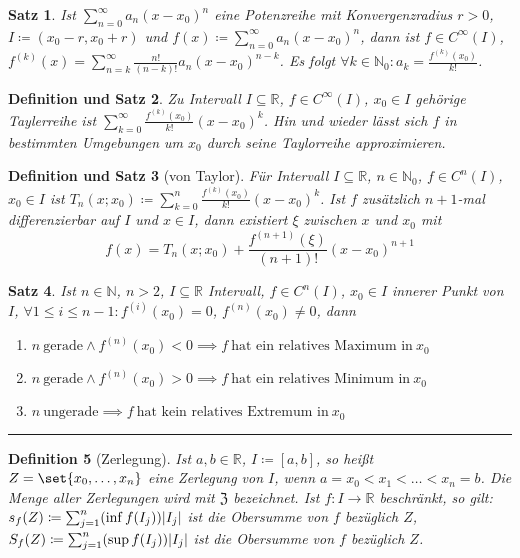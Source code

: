 \documentclass[a4paper]{article}
\newcounter{Sec}
\theoremstyle{marginbreak}
\newtheorem{definition}{Definition}[Sec]
\newtheorem{satz}[definition]{Satz}
\newtheorem{defsatz}[definition]{Definition und Satz}
\newcommand{\sep}{%
	\rule{\textwidth}{0.3pt}%
	\stepcounter{Sec}%
	}
\newcommand{\series}[1][1]{\sum_{n=#1}^\infty}
\newcommand{\ps}[1][a]{\series[0]#1_n(x-x_0)^n}
\begin{document}
	\begin{satz}
		Ist $\ps$ eine Potenzreihe mit Konvergenzradius $r>0$, $I\coloneqq(x_0-r,x_0+r)$ und
		$f(x)\coloneqq\ps$, dann ist $f\in C^\infty(I)$, $f^{(k)}(x)=\sum_{n=k}^{\infty}\frac{n!}{(n-k)!}a_n(x-x_0)^{n-k}$.
		Es folgt $\forall k\in\mathbb{N}_0:a_k=\frac{f^{(k)}(x_0)}{k!}$.
	\end{satz}
	\begin{defsatz}
		Zu Intervall $I\subseteq\mathbb{R}$, $f\in C^\infty(I)$, $x_0\in I$ gehörige
		Taylerreihe ist $\sum_{k=0}^\infty\frac{f^{(k)}(x_0)}{k!}(x - x_0)^k$.
		Hin und wieder lässt sich $f$ in bestimmten Umgebungen um $x_0$ durch seine
		Taylorreihe approximieren.
	\end{defsatz}
	\begin{defsatz}[von Taylor]
		Für Intervall $I\subseteq\mathbb{R}$, $n\in\mathbb{N}_0$, $f\in  C^n(I)$,
		$x_0\in I$ ist $T_n(x;x_0)\coloneqq\sum_{k=0}^n\frac{f^{(k)}(x_0)}{k!}(x-x_0)^k$.
		Ist $f$ zusätzlich $n+1$-mal differenzierbar auf $I$ und $x\in I$, dann existiert
		$\xi$ zwischen $x$ und $x_0$ mit
		\[ f(x) = T_n(x;x_0)+\frac{f^{(n+1)}(\xi)}{(n+1)!}(x-x_0)^{n+1} \]
	\end{defsatz}
	\begin{satz}
		Ist $n\in\mathbb{N}$, $n>2$, $I\subseteq\mathbb{R}$ Intervall,
		$f\in C^n(I)$, $x_0\in I$ innerer Punkt von $I$, $\forall 1\leq i\leq n-1:f^{(i)}(x_0)=0$,
		$f^{(n)}(x_0)\neq0$, dann
		\begin{enumerate}[label=(\alph*)]
			\item $n~\text{gerade}\wedge f^{(n)}(x_0)<0\implies f~\text{hat ein relatives Maximum in}~x_0$
			\item $n~\text{gerade}\wedge f^{(n)}(x_0)>0\implies f~\text{hat ein relatives Minimum in}~x_0$
			\item $n~\text{ungerade}\implies f~\text{hat kein relatives Extremum in}~x_0$
		\end{enumerate}
	\end{satz}
	\sep
	\begin{definition}[Zerlegung]
		Ist $a,b\in\mathbb{R}$, $I\coloneqq[a,b]$, so heißt $Z=\set{x_0,\ldots,x_n}$ eine
		Zerlegung von $I$, wenn $a=x_0<x_1<\ldots<x_n=b$. Die Menge aller Zerlegungen
		wird mit $\mathfrak{Z}$ bezeichnet. Ist $f\colon I\to\mathbb{R}$ beschränkt, so gilt:
		$s_f(Z)\coloneqq\sum_{j=1}^n(\inf f(I_j))\abs{I_j}$ ist die Obersumme
		von $f$ bezüglich $Z$, $S_f(Z)\coloneqq\sum_{j=1}^n(\sup f(I_j))\abs{I_j}$
		ist die Obersumme von $f$ bezüglich $Z$.
	\end{definition}
\end{document}
